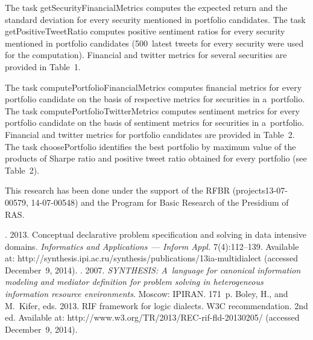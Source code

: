 \begin{multicols}{2}
{  The task {\sf getSecurityFinancialMetrics} computes the expected return and
the standard deviation for every security mentioned in portfolio candidates.
 The task
{\sf getPositiveTweetRatio} computes positive sentiment ratios for every security
mentioned in portfolio candidates (500~latest tweets for every security were used for
the computation). Financial and twitter metrics for several securities are provided in
Table~1.



  The task {\sf computePortfolioFinancialMetrics} computes financial metrics for
every portfolio candidate on the basis of respective metrics for
securities in a~portfolio. The task {\sf computePortfolioTwitterMetrics} computes sentiment
metrics for every portfolio candidate on the basis of sentiment metrics for securities in
a~portfolio. Financial and twitter metrics for portfolio candidates are provided in
Table~2. The task {\sf choosePortfolio} identifies the best portfolio by maximum
value of the products of Sharpe ratio and positive tweet ratio obtained for every
portfolio (see Table~2).


}

\vspace*{-9pt}

\Ack
\noindent
This research has been done under the support of the \mbox{RFBR} (projects13-07-00579,
14-07-00548) and the Program for Basic Research of the Presidium of RAS.

\renewcommand{\bibname}{\protect\rmfamily References}

\vspace*{-9pt}

{\small\frenchspacing
{%
\begin{thebibliography}{99}

.
2013. Conceptual declarative problem specification and solving in data intensive domains.
\textit{Informatics and Applications}~--- \textit{Inform \mbox{Appl.}} 7(4):112--139.
Available at: {\sf http://synthesis.ipi.ac.\linebreak ru/synthesis/publications/13ia-multidialect}
 (accessed December~9, 2014).
. 2007.
\textit{SYNTHESIS: A~language for canonical information modeling and mediator
definition for problem solving in heterogeneous information resource environments}.
Moscow: IPIRAN. 171~p.
Boley, H., and M.~Kifer, eds. 2013. {RIF framework for logic dialects. W3C
recommendation}. 2nd ed. Available at:
{\sf http://www.w3.org/TR/2013/REC-rif-fld-20130205/}
(accessed December~9, 2014).


\end{thebibliography}}}
\end{multicols}
